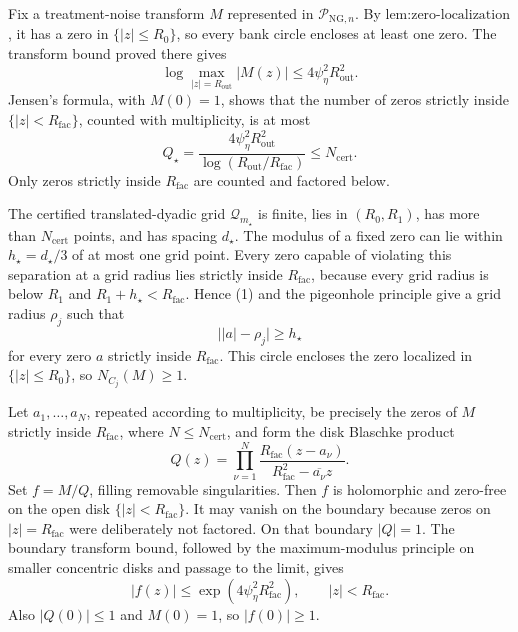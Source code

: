 Fix a treatment-noise transform \(M\) represented in \(\mathcal P_{\mathrm{NG},n}\).  By \(\text{lem:zero-localization}\), it has a zero in \(\{|z|\le R_0\}\), so every bank circle encloses at least one zero.  The transform bound proved there gives
\[
 \log\max_{|z|=R_{\mathrm{out}}}|M(z)|
 \le4\psi_{\eta}^2R_{\mathrm{out}}^2.
\]
Jensen's formula, with \(M(0)=1\), shows that the number of zeros strictly inside \(\{|z|<R_{\mathrm{fac}}\}\), counted with multiplicity, is at most
\[
 Q_{\star}
 =\frac{4\psi_{\eta}^2R_{\mathrm{out}}^2}
        {\log(R_{\mathrm{out}}/R_{\mathrm{fac}})}
 \le N_{\mathrm{cert}}. \tag{1}
\]
Only zeros strictly inside \(R_{\mathrm{fac}}\) are counted and factored below.

The certified translated-dyadic grid \(\mathcal Q_{m_{\star}}\) is finite, lies in \((R_0,R_1)\), has more than \(N_{\mathrm{cert}}\) points, and has spacing \(d_{\star}\).  The modulus of a fixed zero can lie within \(h_{\star}=d_{\star}/3\) of at most one grid point.  Every zero capable of violating this separation at a grid radius lies strictly inside \(R_{\mathrm{fac}}\), because every grid radius is below \(R_1\) and \(R_1+h_{\star}<R_{\mathrm{fac}}\).  Hence (1) and the pigeonhole principle give a grid radius \(\rho_j\) such that
\[
 \bigl||a|-\rho_j\bigr|\ge h_{\star}
\]
for every zero \(a\) strictly inside \(R_{\mathrm{fac}}\).  This circle encloses the zero localized in \(\{|z|\le R_0\}\), so \(N_{C_j}(M)\ge1\).

Let \(a_1,\ldots,a_N\), repeated according to multiplicity, be precisely the zeros of \(M\) strictly inside \(R_{\mathrm{fac}}\), where \(N\le N_{\mathrm{cert}}\), and form the disk Blaschke product
\[
 Q(z)=\prod_{\nu=1}^N
 \frac{R_{\mathrm{fac}}(z-a_\nu)}
      {R_{\mathrm{fac}}^2-\overline{a_\nu}z}.
\]
Set \(f=M/Q\), filling removable singularities.  Then \(f\) is holomorphic and zero-free on the open disk \(\{|z|<R_{\mathrm{fac}}\}\).  It may vanish on the boundary because zeros on \(|z|=R_{\mathrm{fac}}\) were deliberately not factored.  On that boundary \(|Q|=1\).  The boundary transform bound, followed by the maximum-modulus principle on smaller concentric disks and passage to the limit, gives
\[
 |f(z)|\le \exp(4\psi_{\eta}^2R_{\mathrm{fac}}^2),
 \qquad |z|<R_{\mathrm{fac}}. \tag{2}
\]
Also \(|Q(0)|\le1\) and \(M(0)=1\), so \(|f(0)|\ge1\).

